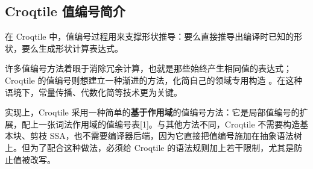 \subsection*{Croqtile 值编号简介}

在 Croqtile 中，值编号过程用来支撑形状推导：要么直接推导出编译时已知的形状，要么生成形状计算表达式。

许多值编号方法着眼于消除冗余计算，也就是那些始终产生相同值的表达式；Croqtile 的值编号则想建立一种渐进的方法，化简自己的领域专用构造 \co@mdspan@。在这种语境下，常量传播、代数化简等技术更为关键。

实现上，Croqtile 采用一种简单的\textbf{基于作用域}的值编号方法：它是局部值编号的扩展，配上一张词法作用域的值编号表[1]。与其他方法不同，Croqtile 不需要构造基本块、剪枝 SSA，也不需要编译器后端，因为它直接把值编号施加在抽象语法树上。但为了配合这种做法，必须给 Croqtile 的语法规则加上若干限制，尤其是防止值被改写。
